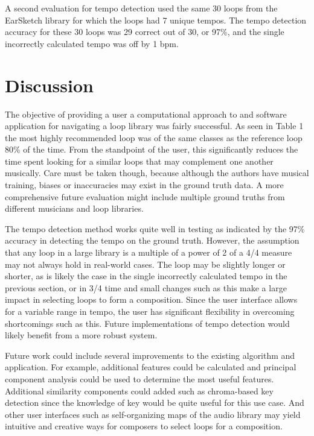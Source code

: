 \documentclass{article}
\begin{document}
A second evaluation for tempo detection used the same 30 loops from the EarSketch library for which the loops had 7 unique tempos. The tempo detection accuracy for these 30 loops was 29 correct out of 30, or 97\%, and the single incorrectly calculated tempo was off by 1 bpm.


\section{Discussion}

The objective of providing a user a computational approach to and software application for navigating a loop library was fairly successful. As seen in Table 1 the most highly recommended loop was of the same classes as the reference loop 80\% of the time. From the standpoint of the user, this significantly reduces the time spent looking for a similar loops that may complement one another musically. Care must be taken though, because although the authors have musical training, biases or inaccuracies may exist in the ground truth data. A more comprehensive future evaluation might include multiple ground truths from different musicians and loop libraries.

The tempo detection method works quite well in testing as indicated by the 97\% accuracy in detecting the tempo on the ground truth. However, the assumption that any loop in a large library is a multiple of a power of 2 of a 4/4 measure may not always hold in real-world cases. The loop may be slightly longer or shorter, as is likely the case in the single incorrectly calculated tempo in the previous section, or in 3/4 time and small changes such as this make a large impact in selecting loops to form a composition. Since the user interface allows for a variable range in tempo, the user has significant flexibility in overcoming shortcomings such as this. Future implementations of tempo detection would likely benefit from a more robust system.

Future work could include several improvements to the existing algorithm and application. For example, additional features could be calculated and principal component analysis could be used to determine the most useful features. Additional similarity components could added such as chroma-based key detection since the knowledge of key would be quite useful for this use case. And other user interfaces such as self-organizing maps of the audio library may yield intuitive and creative ways for composers to select loops for a composition.
\end{document}
